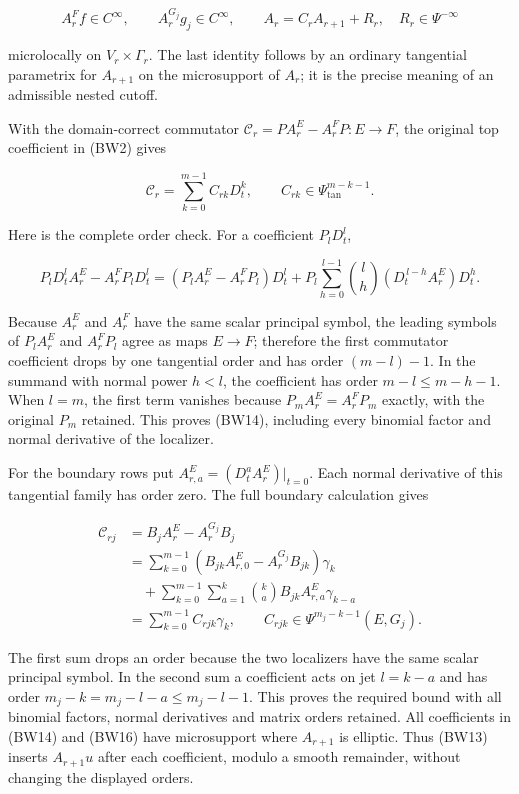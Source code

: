 \documentclass[
  11pt,
]{article}
\begin{document}
\[
 A_r^Ff\in C^\infty,\qquad A_r^{G_j}g_j\in C^\infty,
 \qquad A_r=C_rA_{r+1}+R_r,\quad R_r\in\Psi^{-\infty}
 \tag{BW13}
\]

microlocally on \(V_r\times\Gamma_r\). The last identity follows by an
ordinary tangential parametrix for \(A_{r+1}\) on the microsupport of
\(A_r\); it is the precise meaning of an admissible nested cutoff.

With the domain-correct commutator
\(\mathcal C_r=PA_r^E-A_r^FP:E\to F\), the original top coefficient in
(BW2) gives

\[
 \mathcal C_r=\sum_{k=0}^{m-1}C_{rk}D_t^k,
 \qquad C_{rk}\in\Psi_{\mathrm{tan}}^{m-k-1}.
 \tag{BW14}
\]

Here is the complete order check. For a coefficient \(P_lD_t^l\),

\[
 P_lD_t^lA_r^E-A_r^FP_lD_t^l
 =(P_lA_r^E-A_r^FP_l)D_t^l
 +P_l\sum_{h=0}^{l-1}\binom lh
       (D_t^{\,l-h}A_r^E)D_t^h.
 \tag{BW15}
\]

Because \(A_r^E\) and \(A_r^F\) have the same scalar principal symbol,
the leading symbols of \(P_lA_r^E\) and \(A_r^FP_l\) agree as maps
\(E\to F\); therefore the first commutator coefficient drops by one
tangential order and has order \((m-l)-1\). In the summand with normal
power \(h<l\), the coefficient has order \(m-l\leq m-h-1\). When
\(l=m\), the first term vanishes because \(P_mA_r^E=A_r^FP_m\) exactly,
with the original \(P_m\) retained. This proves (BW14), including every
binomial factor and normal derivative of the localizer.

For the boundary rows put \(A_{r,a}^E=(D_t^aA_r^E)|_{t=0}\). Each normal
derivative of this tangential family has order zero. The full boundary
calculation gives

\[
 \begin{aligned}
 \mathcal C_{rj}&=B_jA_r^E-A_r^{G_j}B_j\\
 &=\sum_{k=0}^{m-1}
       (B_{jk}A_{r,0}^E-A_r^{G_j}B_{jk})\gamma_k\\
 &\quad+\sum_{k=0}^{m-1}\sum_{a=1}^{k}
       \binom ka B_{jk}A_{r,a}^E\gamma_{k-a}\\
 &=\sum_{k=0}^{m-1}C_{rjk}\gamma_k,\qquad
       C_{rjk}\in\Psi^{m_j-k-1}(E,G_j).
 \end{aligned}
 \tag{BW16}
\]

The first sum drops an order because the two localizers have the same
scalar principal symbol. In the second sum a coefficient acts on jet
\(l=k-a\) and has order \(m_j-k=m_j-l-a\leq m_j-l-1\). This proves the
required bound with all binomial factors, normal derivatives and matrix
orders retained. All coefficients in (BW14) and (BW16) have microsupport
where \(A_{r+1}\) is elliptic. Thus (BW13) inserts \(A_{r+1}u\) after
each coefficient, modulo a smooth remainder, without changing the
displayed orders.
\end{document}
